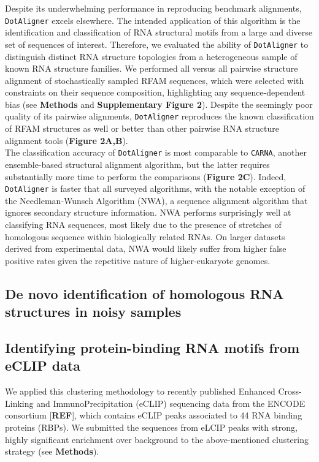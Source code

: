 \documentclass[a4paper,11pt]{article}
\newcommand\dotaligner{\texttt{DotAligner}}
\newcommand\carna{\texttt{CARNA}}
\begin{document}
Despite its underwhelming performance in reproducing benchmark alignments, \dotaligner{} 
excels elsewhere. The intended application of this algorithm is the identification and
classification of RNA structural motifs from a large and diverse set of sequences of interest. 
Therefore, we evaluated the ability of \dotaligner{} to distinguish distinct RNA structure
 topologies from a heterogeneous sample of known 
 RNA structure families. We performed all versus all 
pairwise structure alignment of stochastically sampled RFAM sequences, which 
were selected with constraints on their sequence composition,  highlighting any 
sequence-dependent bias (see \textbf{Methods} and \textbf{Supplementary Figure 2}). Despite the seemingly
poor quality of its pairwise alignments, \dotaligner{} reproduces the known classification 
of RFAM structures as well or better than other pairwise RNA structure alignment tools
(\textbf{Figure 2A,B}). \\

The classification accuracy  of \dotaligner{} is most comparable 
to \carna{}, another ensemble-based structural alignment algorithm, but the latter
requires substantially more time to perform the comparisons (\textbf{Figure 2C}). 
Indeed, \dotaligner{} is faster that all surveyed algorithms, with the notable 
exception of the Needleman-Wunsch Algorithm (NWA), a sequence alignment 
algorithm that ignores secondary structure information. NWA performs 
surprisingly well at classifying RNA sequences, most likely due to the presence
of stretches of homologous sequence within biologically related RNAs. On 
larger datasets derived from experimental data, NWA would likely suffer from 
higher false positive rates given the repetitive nature of higher-eukaryote genomes.

\subsection*{ De novo identification of homologous RNA structures in noisy samples }

\subsection*{ Identifying protein-binding RNA motifs from eCLIP data }
We applied this clustering methodology to recently published Enhanced Cross-Linking 
and ImmunoPrecipitation (eCLIP) sequencing data from the ENCODE consortium [\textbf{REF}], 
which contains eCLIP peaks associated to 44 RNA binding proteins (RBPs). We submitted the
sequences from eLCIP peaks with strong, highly significant enrichment over background 
to the above-mentioned clustering strategy (see \textbf{Methods}). 
\end{document}
